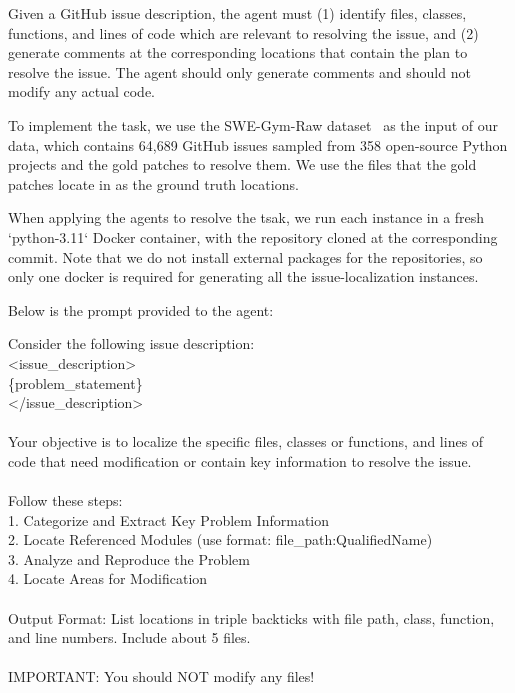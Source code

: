 \documentclass{article}
\theoremstyle{plain}
\theoremstyle{definition}
\theoremstyle{remark}
\begin{document}
Given a GitHub issue description, the agent must (1) identify files, classes, functions, and lines of code which are relevant to resolving the issue, and (2) generate comments at the corresponding locations that contain the plan to resolve the issue. The agent should only generate comments and should not modify any actual code.

To implement the task, we use the SWE-Gym-Raw dataset~\citep{swegym} as the input of our data, which contains 64,689 GitHub issues sampled from 358 open-source Python projects and the gold patches to resolve them.
We use the files that the gold patches locate in as the ground truth locations.

When applying the agents to resolve the tsak, we run each instance in a fresh `python-3.11` Docker container, with the repository cloned at the corresponding commit. Note that we do not install external packages for the repositories, so only one docker is required for generating all the issue-localization instances.

Below is the prompt provided to the agent:

\begin{tcolorbox}[colback=gray!5!white,colframe=gray!75!black,title=Issue Localization Prompt,fontupper=\small\ttfamily,breakable]
Consider the following issue description:\\
<issue\_description>\\
\{problem\_statement\}\\
</issue\_description>\\
\\
Your objective is to localize the specific files, classes or functions, and lines of code that need modification or contain key information to resolve the issue.\\
\\
Follow these steps:\\
1. Categorize and Extract Key Problem Information\\
2. Locate Referenced Modules (use format: file\_path:QualifiedName)\\
3. Analyze and Reproduce the Problem\\
4. Locate Areas for Modification\\
\\
Output Format: List locations in triple backticks with file path, class, function, and line numbers. Include about 5 files.\\
\\
IMPORTANT: You should NOT modify any files!
\end{tcolorbox}
\end{document}
